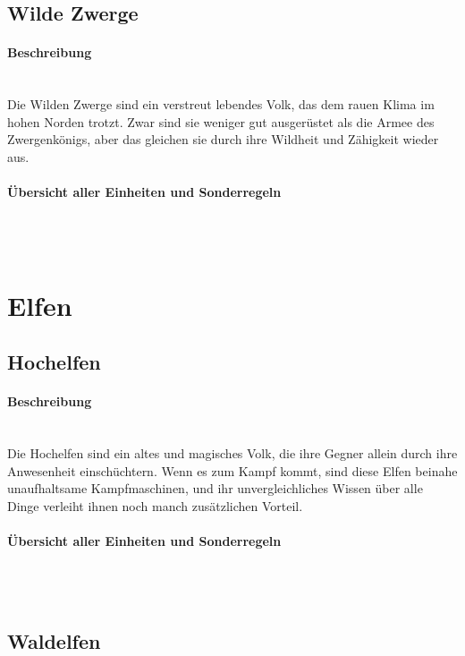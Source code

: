 \documentclass[a4paper,11pt]{report}
\begin{document}
\subsection{Wilde Zwerge}
\paragraph{Beschreibung}~\\
Die Wilden Zwerge sind ein verstreut lebendes Volk, das dem rauen Klima im hohen Norden trotzt. Zwar sind sie weniger gut ausgerüstet als die Armee des Zwergenkönigs, aber das gleichen sie durch ihre Wildheit und Zähigkeit wieder aus.

\paragraph{Übersicht aller Einheiten und Sonderregeln}~\\
\\



\section{Elfen}
\subsection{Hochelfen}
\paragraph{Beschreibung}~\\
Die Hochelfen sind ein altes und magisches Volk, die ihre Gegner allein durch ihre Anwesenheit einschüchtern. Wenn es zum Kampf kommt, sind diese Elfen beinahe unaufhaltsame Kampfmaschinen, und ihr unvergleichliches Wissen über alle Dinge verleiht ihnen noch manch zusätzlichen Vorteil.

\paragraph{Übersicht aller Einheiten und Sonderregeln}~\\
\\



\subsection{Waldelfen}
\end{document}
